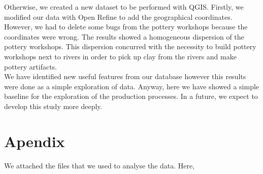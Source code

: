 \documentclass[10pt,a4paper]{article}
\begin{document}
Otherwise, we created a new dataset to be performed with QGIS. Firstly, we modified our data with Open Refine to add the geographical coordinates. However, we had to delete some bugs from the pottery workshops because the coordinates were wrong. The results showed a homogeneous dispersion of the pottery workshops. This dispersion concurred with the necessity to build pottery workshops next to rivers in order to pick up clay from the rivers and make pottery artifacts. \\

We have identified new useful features from our database however this results were done as a simple exploration of data. Anyway, here we have showed a simple baseline for the exploration of the production processes. In a future, we expect to develop this study more deeply. 


\section{Apendix}

We attached the files that we used to analyse the data. Here, 
\end{document}
